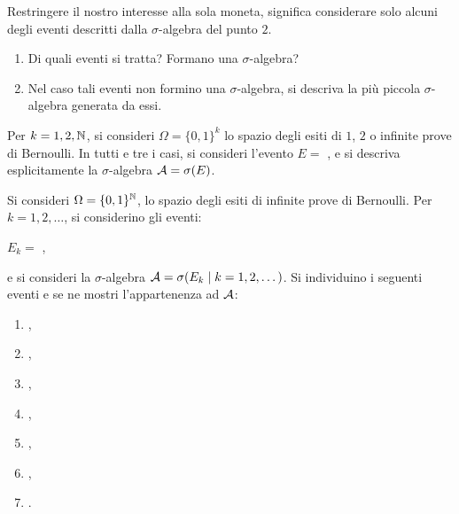 Restringere il nostro interesse alla sola moneta, significa considerare solo alcuni degli eventi descritti dalla $\sigma $-algebra del punto $2$.
\begin{enumerate}[resume]
	\item Di quali eventi si tratta? Formano una $\sigma $-algebra?
	\item Nel caso tali eventi non formino una $\sigma $-algebra, si descriva la più piccola $\sigma $-algebra generata da essi.
\end{enumerate}

\Esercizio{}

Per $k=1,2,\mathbb{N}$, si consideri $\Omega =\{0,1\}^{k}$ lo spazio degli esiti di $1$, $2$ o infinite prove di Bernoulli. In tutti e tre i casi, si consideri l'evento $E=$ , e si descriva esplicitamente la $\sigma$-algebra $\mathcal{A} =\sigma (E)$.

\Esercizio{}

Si consideri $\Omega =\{0,1\}^{\mathbb{N}}$, lo spazio degli esiti di infinite prove di Bernoulli. Per $k=1,2,\dots $, si considerino gli eventi:
\begin{center}
	$E_{k}=$ ,
\end{center}
e si consideri la $\sigma $-algebra $\mathcal{A} =\sigma (E_{k} \mid k=1,2,\dots)$. Si individuino i seguenti eventi e se ne mostri l'appartenenza ad $\mathcal{A}$:
\begin{enumerate}
	\item {},
	\item {},
	\item {},
	\item {},
	\item {},
	\item {},
	\item {}.
\end{enumerate}

\Esercizio{}

